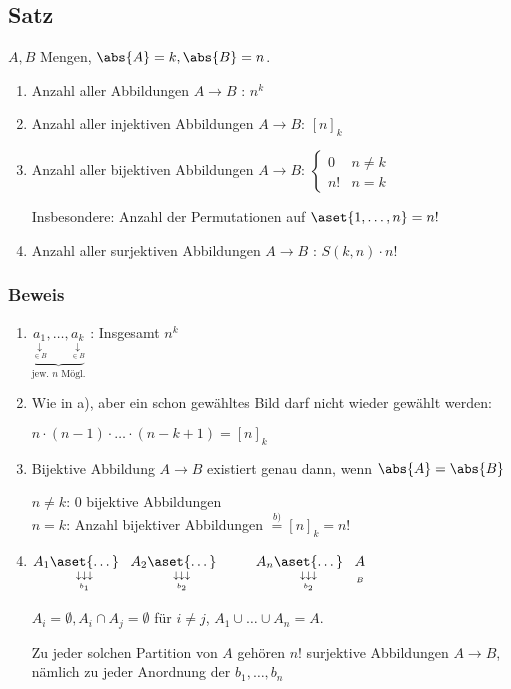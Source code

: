 \subsection{Satz} %

$A, B$ Mengen, $\abs{A}=k, \abs{B} = n$.

\begin{enumerate}
	\item
	Anzahl aller Abbildungen $A \to B$ : $n^k$
	
	\item
	Anzahl aller injektiven Abbildungen $A \to B$: $[n]_k$
	
	\item
	Anzahl aller bijektiven Abbildungen $A \to B$: 
	$\begin{cases}
	0 & n \neq k \\
	n! & n = k
	\end{cases}$
	
	Insbesondere: Anzahl der Permutationen auf $\aset{1, \dots, n} = n!$
	
	\item
	Anzahl aller surjektiven Abbildungen $A \to B$ : $S(k,n)\cdot n!$
	
\end{enumerate}

\subsubsection*{Beweis}

\begin{enumerate}
	\item $\underbrace{\underset{\underset{\in B}{\downarrow}}{a_1}, \dots, \underset{\underset{\in B}{\downarrow}}{a_k}}_{\text{jew. } n \text{ Mögl.}}$ : Insgesamt $n^k$
	
	\item
	Wie in a), aber ein schon gewähltes Bild darf nicht wieder gewählt werden:
	
	$n \cdot (n-1) \cdot \dots \cdot (n-k+1) = [n]_k$
	
	\item
	Bijektive Abbildung $A \to B$ existiert genau dann, wenn $\abs{A} = \abs{B}$
	
	$n \neq k$: 0 bijektive Abbildungen
	\\$n = k$: Anzahl bijektiver Abbildungen $\stackrel{b)}{=} [n]_k = n!$
	
	\item
	
	$A_1 \underset{\underset{b_1}{\downarrow\downarrow\downarrow}}{\aset{\dots}} \;\;\;
	A_2 \underset{\underset{b_2}{\downarrow\downarrow\downarrow}}{\aset{\dots}} \;\;\;
	\qquad
	A_n \underset{\underset{b_2}{\downarrow\downarrow\downarrow}}{\aset{\dots}} \;\;\;
	 \underset{\underset{B}{}}{A} \;\;\;
	$
	
	$A_i = \emptyset, A_i \cap A_j = \emptyset$ für $i \neq j$, 
	$A_1 \cup \dots \cup A_n = A$.
	
	Zu jeder solchen Partition von $A$ gehören $n!$ surjektive Abbildungen $A \to B$, nämlich zu jeder Anordnung der $b_1, \dots, b_n$
	
\end{enumerate}

